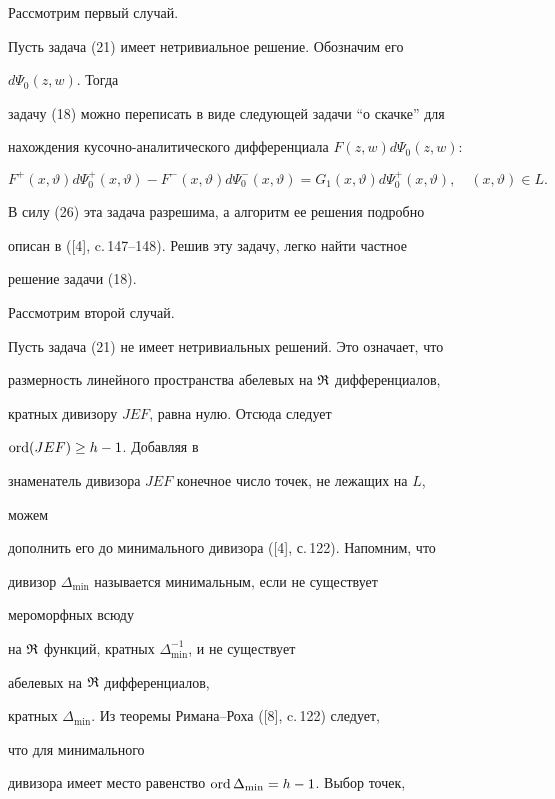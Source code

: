  


Рассмотрим первый случай. 


Пусть задача (21) имеет нетривиальное решение. Обозначим его 


$d\Psi_0(z,w)$. Тогда 


задачу (18) можно переписать в виде следующей задачи ``о скачке'' для 


нахождения кусочно-аналитического дифференциала $F(z,w)d\Psi_0(z,w)$: 


$$ 


F^+(x,\vartheta)d\Psi^+_0(x,\vartheta)- 


F^-(x,\vartheta)d\Psi^-_0(x,\vartheta)= 


G_1(x,\vartheta)d\Psi^+_0(x,\vartheta),\quad 


(x,\vartheta)\in L. 


$$ 


В силу (26) эта задача разрешима, а алгоритм ее решения подробно 


описан в ([4], c.\,147--148). Решив эту задачу, легко найти частное 


решение задачи (18). 


 


Рассмотрим второй случай. 


Пусть задача (21) не имеет нетривиальных решений. Это означает, что 


размерность линейного пространства абелевых на $\frak R$ дифференциалов, 


кратных дивизору $JEF$, равна нулю. Отсюда следует


$\operatorname{ord}(JEF)\ge h-1$. Добавляя в 


знаменатель дивизора $JEF$ конечное число точек, не лежащих на $L$, 


можем 


дополнить его до минимального дивизора ([4], с.\,122). Напомним, что 


дивизор $\Delta_{\min}$ называется минимальным, если не существует 


мероморфных всюду 


на $\frak R$ функций, кратных $\Delta^{-1}_{\min}$, и не существует 


абелевых на $\frak R$ дифференциалов, 


кратных $\Delta_{\min}$. Из теоремы Римана--Роха ([8], c.\,122) следует, 


что для минимального 


дивизора имеет место равенство $\operatorname{ord}\Delta_{\min}=h-1$. Выбор точек, 


